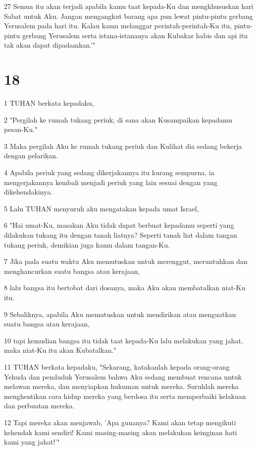 \par 27 Semua itu akan terjadi apabila kamu taat kepada-Ku dan mengkhususkan hari Sabat untuk Aku. Jangan mengangkut barang apa pun lewat pintu-pintu gerbang Yerusalem pada hari itu. Kalau kamu melanggar perintah-perintah-Ku itu, pintu-pintu gerbang Yerusalem serta istana-istananya akan Kubakar habis dan api itu tak akan dapat dipadamkan.'"

\chapter{18}

\par 1 TUHAN berkata kepadaku,
\par 2 "Pergilah ke rumah tukang periuk; di sana akan Kusampaikan kepadamu pesan-Ku."
\par 3 Maka pergilah Aku ke rumah tukang periuk dan Kulihat dia sedang bekerja dengan pelarikan.
\par 4 Apabila periuk yang sedang dikerjakannya itu kurang sempurna, ia mengerjakannya kembali menjadi periuk yang lain sesuai dengan yang dikehendakinya.
\par 5 Lalu TUHAN menyuruh aku mengatakan kepada umat Israel,
\par 6 "Hai umat-Ku, masakan Aku tidak dapat berbuat kepadamu seperti yang dilakukan tukang itu dengan tanah liatnya? Seperti tanah liat dalam tangan tukang periuk, demikian juga kamu dalam tangan-Ku.
\par 7 Jika pada suatu waktu Aku memutuskan untuk merenggut, meruntuhkan dan menghancurkan suatu bangsa atau kerajaan,
\par 8 lalu bangsa itu bertobat dari dosanya, maka Aku akan membatalkan niat-Ku itu.
\par 9 Sebaliknya, apabila Aku memutuskan untuk mendirikan atau menguatkan suatu bangsa atau kerajaan,
\par 10 tapi kemudian bangsa itu tidak taat kepada-Ku lalu melakukan yang jahat, maka niat-Ku itu akan Kubatalkan."
\par 11 TUHAN berkata kepadaku, "Sekarang, katakanlah kepada orang-orang Yehuda dan penduduk Yerusalem bahwa Aku sedang membuat rencana untuk melawan mereka, dan menyiapkan hukuman untuk mereka. Suruhlah mereka menghentikan cara hidup mereka yang berdosa itu serta memperbaiki kelakuan dan perbuatan mereka.
\par 12 Tapi mereka akan menjawab, 'Apa gunanya? Kami akan tetap mengikuti kehendak kami sendiri! Kami masing-masing akan melakukan keinginan hati kami yang jahat!'"

